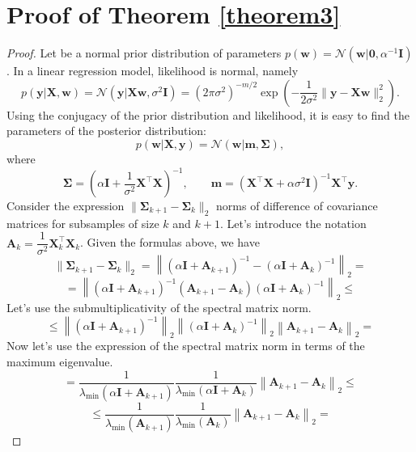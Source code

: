 \documentclass[runningheads]{llncs}
\begin{document}
\section{Proof of Theorem \ref{theorem3}}
\begin{proof}
Let be a normal prior distribution of parameters $p(\mathbf{w})=\mathcal{N}\left(\mathbf{w}|\mathbf{0}, \alpha^{-1}\mathbf{I}\right)$. In a linear regression model, likelihood is normal, namely
    \[ p(\mathbf{y} | \mathbf{X}, \mathbf{w}) = \mathcal{N}\left(\mathbf{y} |\mathbf{X}\mathbf{w}, \sigma^2\mathbf{I}\right) =\left( 2\pi\sigma^2\right)^{-m/2} \exp\left( -\dfrac{1}{2\sigma^2} \|\mathbf{y} - \mathbf{X}\mathbf{w}\|_2^2\right). \]
Using the conjugacy of the prior distribution and likelihood, it is easy to find the parameters of the posterior distribution:
    \[ p(\mathbf{w} | \mathbf{X}, \mathbf{y}) = \mathcal{N}\left(\mathbf{w} | \mathbf{m}, \mathbf{\Sigma} \right), \]
where
    \[ \mathbf{\Sigma} = \left( \alpha \mathbf{I} + \dfrac{1}{\sigma^2} \mathbf{X}^{\top} \mathbf{X} \right)^{-1}, \qquad \mathbf{m} = \left( \mathbf{X}^{\top} \mathbf{X} + \alpha \sigma^2 \mathbf{I} \right)^{-1} \mathbf{X}^{\top} \mathbf{y}. \]
Consider the expression $\|\mathbf{\Sigma}_{k+1} - \mathbf{\Sigma}_k\|_2$ norms of difference of covariance matrices for subsamples of size $k$ and $k+1$. Let's introduce the notation $\mathbf{A}_k = \dfrac{1}{\sigma^2}\mathbf{X}^{\top}_k\mathbf{X}_k$. Given the formulas above, we have
    \[ \| \mathbf{\Sigma}_{k+1} - \mathbf{\Sigma}_k \|_2 = \left\| \left( \alpha \mathbf{I} + \mathbf{A}_{k+1} \right)^{-1} - \left( \alpha \mathbf{I} + \mathbf{A}_k \right)^{-1} \right\|_2 = \]
    \[ = \left\| \left( \alpha \mathbf{I} + \mathbf{A}_{k+1} \right)^{-1} \left( \mathbf{A}_{k+1} - \mathbf{A}_k \right) \left( \alpha \mathbf{I} + \mathbf{A}_k \right)^{-1} \right\|_2 \leqslant \]
    Let's use the submultiplicativity of the spectral matrix norm.
    \[ \leqslant \left\| \left( \alpha \mathbf{I} + \mathbf{A}_{k+1} \right)^{-1} \right\|_2 \left\| \left( \alpha \mathbf{I} + \mathbf{A}_k \right)^{-1} \right\|_2 \left\| \mathbf{A}_{k+1} - \mathbf{A}_k \right\|_2 = \]
    Now let's use the expression of the spectral matrix norm in terms of the maximum eigenvalue.
    \[ = \dfrac{1}{\lambda_{\min}\left( \alpha \mathbf{I} + \mathbf{A}_{k+1} \right)} \dfrac{1}{\lambda_{\min}\left( \alpha \mathbf{I} + \mathbf{A}_k \right)} \left\| \mathbf{A}_{k+1} - \mathbf{A}_k \right\|_2 \leqslant \]
    \[ \leqslant \dfrac{1}{\lambda_{\min}\left( \mathbf{A}_{k+1} \right)} \dfrac{1}{\lambda_{\min}\left( \mathbf{A}_k \right)} \left\| \mathbf{A}_{k+1} - \mathbf{A}_k \right\|_2 = \]

\end{proof}
\end{document}
